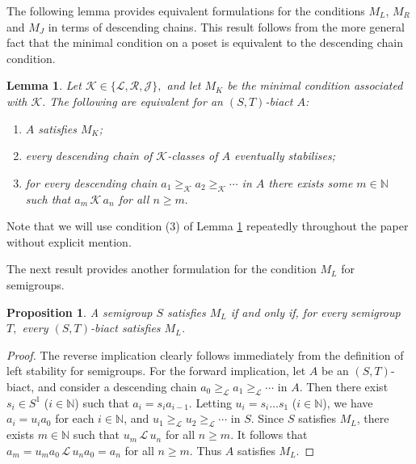 \documentclass[twoside,a4paper,12pt,reqno]{amsart}
\theoremstyle{plain}
\newtheorem{lem}[thm]{Lemma}
\newtheorem{prop}[thm]{Proposition}
\theoremstyle{definition}
\renewcommand{\l}{\mbox{${\mathcal{L}}$}}
\renewcommand{\r}{\mbox{${\mathcal{R}}$}}
\renewcommand{\j}{\mbox{${\mathcal{J}}$}}
\renewcommand{\k}{\mbox{${\mathcal{K}}$}}
\newcommand{\geql}{\geq_{\mathcal{L}}}
\newcommand{\geqk}{\geq_{\mathcal{K}}}
\newcommand{\N}{\mathbb{N}}
\begin{document}
The following lemma provides equivalent formulations for the conditions $M_L$, $M_R$ and $M_J$ in terms of descending chains.  This result follows from the more general fact that the minimal condition on a poset is equivalent to the descending chain condition.

\begin{lem}\label{lem:M_K}
Let $\k\in\{\l,\r,\j\},$ and let $M_K$ be the minimal condition associated with $\k.$  The following are equivalent for an $(S,T)$-biact $A$:
\begin{enumerate}[leftmargin=*]
\item[\emph{(1)}] $A$ satisfies $M_K$;
\item[\emph{(2)}] every descending chain of $\k$-classes of $A$ eventually stabilises;
\item[\emph{(3)}] for every descending chain $a_1\geqk a_2\geqk\cdots$ in $A$ there exists some $m\in\N$ such that $a_m\,\k\,a_n$ for all $n\geq m.$
\end{enumerate}
\end{lem}
%

Note that we will use condition (3) of Lemma \ref{lem:M_K} repeatedly throughout the paper without explicit mention.

The next result provides another formulation for the condition $M_L$ for semigroups.

\begin{prop}\label{prop:M_L}
A semigroup $S$ satisfies $M_L$ if and only if, for every semigroup $T,$ every $(S,T)$-biact satisfies $M_L$.
\end{prop}

\begin{proof}
The reverse implication clearly follows immediately from the definition of left stability for semigroups.  For the forward implication, let $A$ be an $(S,T)$-biact, and consider a descending chain $a_0\geql a_1\geql\cdots$ in $A.$  Then there exist $s_i\in S^1$ ($i\in\N$) such that $a_i=s_ia_{i-1}$.  Letting $u_i=s_i\dots s_1$ ($i\in\N$), we have $a_i=u_ia_0$ for each $i\in\N$, and $u_1\geql u_2\geql\cdots$ in $S.$  Since $S$ satisfies $M_L$, there exists $m\in\N$ such that $u_m\,\l\,u_n$ for all $n\geq m.$  It follows that $a_m=u_ma_0\,\l\,u_na_0=a_n$ for all $n\geq m.$  Thus $A$ satisfies $M_L$.
\end{proof}
\end{document}
